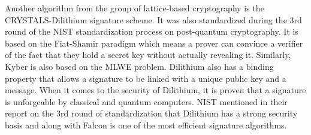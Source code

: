 Another algorithm from the group of lattice-based cryptography is the CRYSTALS-Dilithium signature scheme. It was also standardized during the 3rd round of the NIST standardization process on post-quantum cryptography. It is based on the Fiat-Shamir paradigm which means a prover can convince a verifier of the fact that they hold a secret key without actually revealing it. Similarly, Kyber is also based on the MLWE problem. Dilithium also has a binding property that allows a signature to be linked with a unique public key and a message. When it comes to the security of Dilithium, it is proven that a signature is unforgeable by classical and quantum computers. NIST mentioned in their report on the 3rd round of standardization that Dilithium has a strong security basis and along with Falcon is one of the most efficient signature algorithms. \cite{Alagic2022}
